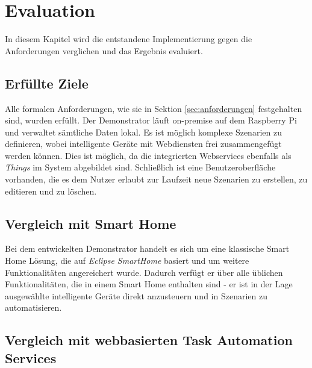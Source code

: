 \chapter{Evaluation}
\label{chap:eval}
In diesem Kapitel wird die entstandene Implementierung gegen die Anforderungen verglichen und das Ergebnis evaluiert.

\section{Erfüllte Ziele}
Alle formalen Anforderungen, wie sie in Sektion \ref{sec:anforderungen} festgehalten sind, wurden erfüllt. Der Demonstrator läuft on-premise auf dem Raspberry Pi und verwaltet sämtliche Daten lokal. Es ist möglich komplexe Szenarien zu definieren, wobei intelligente Geräte mit Webdiensten frei zusammengefügt werden können. Dies ist möglich, da die integrierten Webservices ebenfalls als \textit{Things} im System abgebildet sind. Schließlich ist eine Benutzeroberfläche vorhanden, die es dem Nutzer erlaubt zur Laufzeit neue Szenarien zu erstellen, zu editieren und zu löschen.

\section{Vergleich mit Smart Home}
Bei dem entwickelten Demonstrator handelt es sich um eine klassische Smart Home Lösung, die auf \textit{Eclipse SmartHome} basiert und um weitere Funktionalitäten angereichert wurde. Dadurch verfügt er  über alle üblichen Funktionalitäten, die in einem Smart Home enthalten sind - er ist in der Lage ausgewählte intelligente Geräte direkt anzusteuern und in Szenarien zu automatisieren. 

\section{Vergleich mit webbasierten Task Automation Services}


